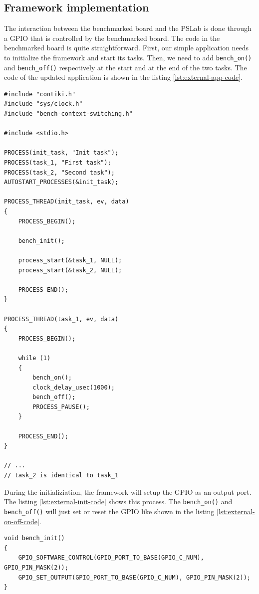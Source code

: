 \subsection{Framework implementation}

The interaction between the benchmarked board and the PSLab is done through a GPIO that is controlled by the benchmarked board.
The code in the benchmarked board is quite straightforward.
First, our simple application needs to initialize the framework and start its tasks.
Then, we need to add \texttt{bench\_on()} and \texttt{bench\_off()} respectively at the start and at the end of the two tasks.
The code of the updated application is shown in the listing \ref{lst:external-app-code}.

\begin{lstlisting}[style=CStyle, float, caption={source code of the simple application in Contiki}, label={lst:external-app-code}]
#include "contiki.h"
#include "sys/clock.h"
#include "bench-context-switching.h"

#include <stdio.h>

PROCESS(init_task, "Init task");
PROCESS(task_1, "First task");
PROCESS(task_2, "Second task");
AUTOSTART_PROCESSES(&init_task);

PROCESS_THREAD(init_task, ev, data)
{
    PROCESS_BEGIN();

    bench_init();

    process_start(&task_1, NULL);
    process_start(&task_2, NULL);

    PROCESS_END();
}

PROCESS_THREAD(task_1, ev, data)
{
    PROCESS_BEGIN();

    while (1)
    {
        bench_on();
        clock_delay_usec(1000);
        bench_off();
        PROCESS_PAUSE();
    }

    PROCESS_END();
}

// ...
// task_2 is identical to task_1
\end{lstlisting}

During the initializiation, the framework will setup the GPIO as an output port. 
The listing \ref{lst:external-init-code} shows this process.
The \texttt{bench\_on()} and \texttt{bench\_off()} will just set or reset the GPIO like shown in the listing \ref{lst:external-on-off-code}.

\begin{lstlisting}[style=CStyle, caption={initializiation of the framework in Contiki}, label={lst:external-init-code}]
void bench_init()
{
    GPIO_SOFTWARE_CONTROL(GPIO_PORT_TO_BASE(GPIO_C_NUM), GPIO_PIN_MASK(2));
    GPIO_SET_OUTPUT(GPIO_PORT_TO_BASE(GPIO_C_NUM), GPIO_PIN_MASK(2));
}
\end{lstlisting}

